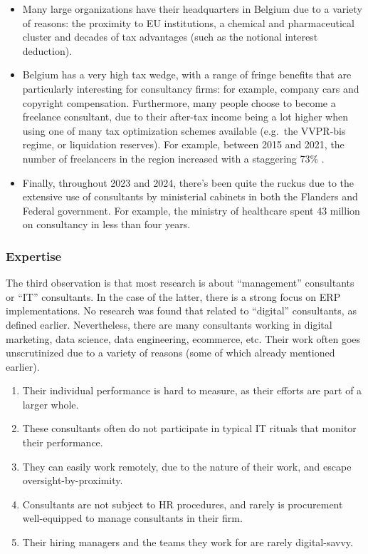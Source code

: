 \documentclass[12pt]{article}
\providecommand{\tightlist}{%
  \setlength{\itemsep}{0pt}\setlength{\parskip}{0pt}}
\begin{document}
\begin{itemize}
\item
  Many large organizations have their headquarters in Belgium due to a
  variety of reasons: the proximity to EU institutions, a chemical and
  pharmaceutical cluster and decades of tax advantages (such as the
  notional interest deduction).
\item
  Belgium has a very high tax wedge, with a range of fringe benefits
  that are particularly interesting for consultancy firms: for example,
  company cars and copyright compensation. Furthermore, many people
  choose to become a freelance consultant, due to their after-tax income
  being a lot higher when using one of many tax optimization schemes
  available (e.g.~the VVPR-bis regime, or liquidation reserves). For
  example, between 2015 and 2021, the number of freelancers in the
  region increased with a staggering 73\% \citep{serv2023}.
\item
  Finally, throughout 2023 and 2024, there's been quite the ruckus due
  to the extensive use of consultants by ministerial cabinets in both
  the Flanders and Federal government. For example, the ministry of
  healthcare spent 43 million on consultancy in less than four years.
  \citep{healthcare2023}
\end{itemize}

\subsubsection{Expertise}\label{expertise}

The third observation is that most research is about ``management''
consultants or ``IT'' consultants. In the case of the latter, there is a
strong focus on ERP implementations. No research was found that related
to ``digital'' consultants, as defined earlier. Nevertheless, there are
many consultants working in digital marketing, data science, data
engineering, ecommerce, etc. Their work often goes unscrutinized due to
a variety of reasons (some of which already mentioned earlier).

\begin{enumerate}
\def\labelenumi{\arabic{enumi}.}
\tightlist
\item
  Their individual performance is hard to measure, as their efforts are
  part of a larger whole.
\item
  These consultants often do not participate in typical IT rituals that
  monitor their performance.
\item
  They can easily work remotely, due to the nature of their work, and
  escape oversight-by-proximity.
\item
  Consultants are not subject to HR procedures, and rarely is
  procurement well-equipped to manage consultants in their firm.
\item
  Their hiring managers and the teams they work for are rarely
  digital-savvy.
\end{enumerate}
\end{document}
